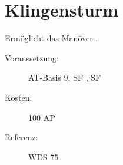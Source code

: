 \section{Klingensturm}
\label{sf.klingensturm}
Ermöglicht das Manöver .
\begin{description}
    \item[Voraussetzung:]
        AT-Basis 9, SF , SF 
    \item [Kosten:]
        100 AP
    \item [Referenz:]
        WDS 75
\end{description}
